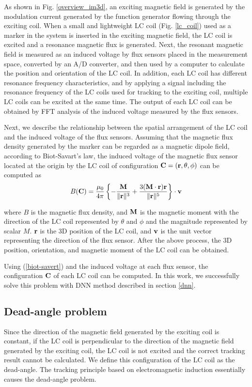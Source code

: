 \documentclass[journal,twoside,web]{ieeecolor}
\begin{document}
As shown in Fig. \ref{overview_im3d}, an exciting magnetic field is generated by the modulation current generated by the function generator flowing through the exciting coil. When a small and lightweight LC coil (Fig. \ref{lc_coil}) used as a marker in the system is inserted in the exciting magnetic field, the LC coil is excited and a resonance magnetic flux is generated. Next, the resonant magnetic field is measured as an induced voltage by flux sensors placed in the measurement space, converted by an A/D converter, and then used by a computer to calculate the position and orientation of the LC coil. In addition, each LC coil has different resonance frequency characteristics, and by applying a signal including the resonance frequency of the LC coils used for tracking to the exciting coil, multiple LC coils can be excited at the same time. The output of each LC coil can be obtained by FFT analysis of the induced voltage measured by the flux sensors.

Next, we describe the relationship between the spatial arrangement of the LC coil and the induced voltage of the flux sensors. Assuming that the magnetic flux density generated by the marker can be regarded as a magnetic dipole field, according to Biot-Savart's law, the induced voltage of the magnetic flux sensor located at the origin by the LC coil of configuration ${\bf C}=({\bf r}, \theta, \phi)$ can be computed as
\begin{equation}
  B({\bf C}) =  \frac{\mu_{0}}{4\pi} \left\{
  -\frac{{\bf M}}{\|{\bf r}\|^{3}}
  +\frac{3({\bf M} \cdot {\bf r}){\bf r}}{\|{\bf r}\|^{5}}
  \right\}\cdot \bf v
  \label{biot-savert}
\end{equation}

where $B$ is the magnetic flux density, and ${\bf M}$ is the magnetic moment with the direction of the LC coil represented by $\theta$ and $\phi$ and the magnitude represented by scalar ${M}$. ${\bf r}$ is the 3D position of the LC coil, and ${\bf v}$ is the unit vector representing the direction of the flux sensor. After the above process, the 3D position, orientation, and magnetic moment of the LC coil can be obtained.

Using (\ref{biot-savert}) and the induced voltage at each flux sensor, the configuration ${\bf C}$ of each LC coil can be computed. In this work, we successfully solve this problem with DNN method described in section \ref{dnn}.

\subsection{Dead-angle problem}
Since the direction of the magnetic field generated by the exciting coil is constant, if the LC coil is perpendicular to the direction of the magnetic field generated by the exciting coil, the LC coil is not excited and the correct tracking result cannot be calculated. We define this configuration of the LC coil as the dead-angle. The tracking principle based on electromagnetic induction essentially causes the dead-angle problem.
\end{document}

